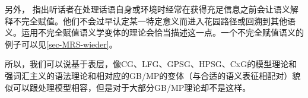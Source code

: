 另外， \citet[--54]{SW2015a}指出听话者在处理话语自身或环境时经常在获得充足信息之前会让语义解释不完全赋值。他们不会过早认定某一特定意义而进入花园路径或回溯到其他语义。运用不完全赋值语义学变体的理论会恰当描述这一点。一个不完全赋值语义的例子可以见\ref{sec-MRS-wieder}。

所以，我们可以说基于表层，像CG、LFG、GPSG、HPSG、CxG的模型理论和强词汇主义的语法理论和相对应的GB/MP的变体（与合适的语义表征相配对）貌似可以跟处理模型相容，但是对于大部分GB/MP理论却不是这样。


